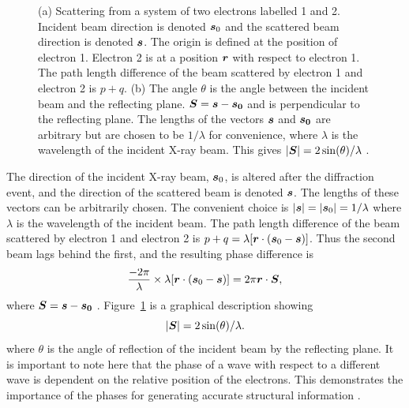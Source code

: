 \begin{figure}
\begin{subfigure}[b]{0.45\textwidth}
                        \caption{}
                        \label{fig:scattering vector}
                \end{subfigure}
                \caption[X-ray scattering from two electrons.]{(a) Scattering from a system of two electrons labelled 1 and 2. Incident beam direction is denoted $\boldsymbol{s}_0$ and the scattered beam direction is denoted $\boldsymbol{s}$.
                The origin is defined at the position of electron 1. Electron 2 is at a position $\boldsymbol{r}$ with respect to electron 1.
                The path length difference of the beam scattered by electron 1 and electron 2 is $p + q$.
                (b) The angle $\theta$ is the angle between the incident beam and the reflecting plane.
                $\boldsymbol{S} = \boldsymbol{s} - \boldsymbol{s_0}$ and is perpendicular to the reflecting plane.
                The lengths of the vectors $\boldsymbol{s}$ and $\boldsymbol{s_0}$ are arbitrary but are chosen to be $1/\lambda$ for convenience, where $\lambda$ is the wavelength of the incident X-ray beam.
                This gives $|\boldsymbol{S}| = 2 \sin(\theta)/\lambda$ \cite{drenth1999}.}
        		\label{fig:Scattering from two electrons}
            \end{figure}
            The direction of the incident X-ray beam, $\boldsymbol{s}_0$, is altered after the diffraction event, and the direction of the scattered beam is denoted $\boldsymbol{s}$.
            The lengths of these vectors can be arbitrarily chosen.
            The convenient choice is $|\boldsymbol{s}| = |\boldsymbol{s}_0| = 1/\lambda$ where $\lambda$ is the wavelength of the incident beam.
            The path length difference of the beam scattered by electron 1 and electron 2 is $p + q = \lambda[\boldsymbol{r} \cdot (\boldsymbol{s}_0 - \boldsymbol{s})]$.
            Thus the second beam lags behind the first, and the resulting phase difference is
            \begin{equation}
                \frac{-2 \pi}{\lambda} \times \lambda[\boldsymbol{r} \cdot (\boldsymbol{s}_0 - \boldsymbol{s})] = 2 \pi \boldsymbol{r} \cdot \boldsymbol{S},
            \end{equation}
            where $\boldsymbol{S} = \boldsymbol{s} - \boldsymbol{s_0}$ \cite{drenth1999}. Figure~\ref{fig:scattering vector} is a graphical description showing
            \begin{equation}
                |\boldsymbol{S}| = 2 \sin(\theta)/\lambda.
                \label{eq:length of vector S}
            \end{equation}
            where $\theta$ is the angle of reflection of the incident beam by the reflecting plane.
            It is important to note here that the phase of a wave with respect to a different wave is dependent on the relative position of the electrons.
            This demonstrates the importance of the phases for generating accurate structural information \cite{taylor2003phase, taylor2010}.

